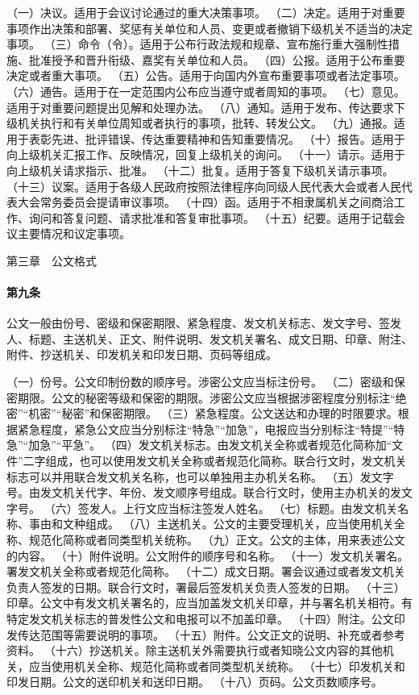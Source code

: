 \documentclass{gbt9704}
\begin{document}
（一）决议。适用于会议讨论通过的重大决策事项。
（二）决定。适用于对重要事项作出决策和部署、奖惩有关单位和人员、变更或者撤销下级机关不适当的决定事项。
（三）命令（令）。适用于公布行政法规和规章、宣布施行重大强制性措施、批准授予和晋升衔级、嘉奖有关单位和人员。
（四）公报。适用于公布重要决定或者重大事项。
（五）公告。适用于向国内外宣布重要事项或者法定事项。
（六）通告。适用于在一定范围内公布应当遵守或者周知的事项。
（七）意见。适用于对重要问题提出见解和处理办法。
（八）通知。适用于发布、传达要求下级机关执行和有关单位周知或者执行的事项，批转、转发公文。
（九）通报。适用于表彰先进、批评错误、传达重要精神和告知重要情况。
（十）报告。适用于向上级机关汇报工作、反映情况，回复上级机关的询问。
（十一）请示。适用于向上级机关请求指示、批准。
（十二）批复。适用于答复下级机关请示事项。
（十三）议案。适用于各级人民政府按照法律程序向同级人民代表大会或者人民代表大会常务委员会提请审议事项。
（十四）函。适用于不相隶属机关之间商洽工作、询问和答复问题、请求批准和答复审批事项。
（十五）纪要。适用于记载会议主要情况和议定事项。

第三章　公文格式


\paragraph{第九条}
公文一般由份号、密级和保密期限、紧急程度、发文机关标志、发文字号、签发人、标题、主送机关、正文、附件说明、发文机关署名、成文日期、印章、附注、附件、抄送机关、印发机关和印发日期、页码等组成。

（一）份号。公文印制份数的顺序号。涉密公文应当标注份号。
（二）密级和保密期限。公文的秘密等级和保密的期限。涉密公文应当根据涉密程度分别标注“绝密”“机密”“秘密”和保密期限。
（三）紧急程度。公文送达和办理的时限要求。根据紧急程度，紧急公文应当分别标注“特急”“加急”，电报应当分别标注“特提”“特急”“加急”“平急”。
（四）发文机关标志。由发文机关全称或者规范化简称加“文件”二字组成，也可以使用发文机关全称或者规范化简称。联合行文时，发文机关标志可以并用联合发文机关名称，也可以单独用主办机关名称。
（五）发文字号。由发文机关代字、年份、发文顺序号组成。联合行文时，使用主办机关的发文字号。
（六）签发人。上行文应当标注签发人姓名。
（七）标题。由发文机关名称、事由和文种组成。
（八）主送机关。公文的主要受理机关，应当使用机关全称、规范化简称或者同类型机关统称。
（九）正文。公文的主体，用来表述公文的内容。
（十）附件说明。公文附件的顺序号和名称。
（十一）发文机关署名。署发文机关全称或者规范化简称。
（十二）成文日期。署会议通过或者发文机关负责人签发的日期。联合行文时，署最后签发机关负责人签发的日期。
（十三）印章。公文中有发文机关署名的，应当加盖发文机关印章，并与署名机关相符。有特定发文机关标志的普发性公文和电报可以不加盖印章。
（十四）附注。公文印发传达范围等需要说明的事项。
（十五）附件。公文正文的说明、补充或者参考资料。
（十六）抄送机关。除主送机关外需要执行或者知晓公文内容的其他机关，应当使用机关全称、规范化简称或者同类型机关统称。
（十七）印发机关和印发日期。公文的送印机关和送印日期。
（十八）页码。公文页数顺序号。
\end{document}

